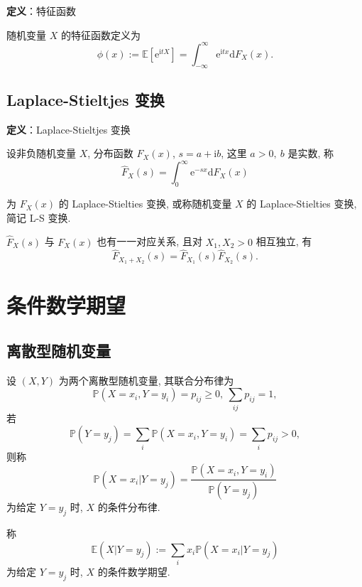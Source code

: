 \documentclass[openany]{ctexbook}
\theoremstyle{kaiti}
\theoremstyle{normal}
\begin{document}
\textbf{定义}：特征函数

随机变量 $X$ 的特征函数定义为 
\begin{equation}
  \phi(x):= \mathbb{E}[\mathrm{e}^{\mathrm{i}tX}]=\int_{-\infty}^\infty\mathrm{e}^{\mathrm{i}tx}\mathrm{d}F_X(x).
\end{equation}

\subsection{Laplace-Stieltjes 变换}

\textbf{定义}：Laplace-Stieltjes 变换

设非负随机变量 $X$, 分布函数 $F_X(x)$, $s=a+\mathrm{i}b$, 这里 $a>0,~b$ 是实数, 称
\begin{equation}
  \hat{F}_X(s)=\int_0^\infty\mathrm{e}^{-sx}\mathrm{d}F_X(x)
\end{equation}

为 $F_X(x)$ 的 Laplace-Stielties 变换, 或称随机变量 $X$ 的 Laplace-Stielties 变换, 简记 L-S 变换. 

$\hat{F}_X(s)$ 与 $F_X(x)$ 也有一一对应关系, 且对 $X_1,X_2>0$ 相互独立, 有
\begin{equation}
  \hat{F}_{X_1+X_2}(s)=\hat{F}_{X_1}(s)\hat{F}_{X_2}(s).
\end{equation}

\section{条件数学期望}

\subsection{离散型随机变量}

设 $(X,Y)$ 为两个离散型随机变量, 其联合分布律为
\begin{equation}
  \mathbb{P}(X=x_i,Y=y_i)=p_{ij}\geqslant0,~\sum_{ij}p_{ij}=1,
\end{equation}
若
\begin{equation}
  \mathbb{P}(Y=y_j)=\sum_i\mathbb{P}(X=x_i,Y=y_i)=\sum_ip_{ij}>0,
\end{equation}
则称
\begin{equation}
  \mathbb{P}(X=x_i|Y=y_j)=\frac{\mathbb{P}(X=x_i,Y=y_i)}{\mathbb{P}(Y=y_j)}
\end{equation}
为给定 $Y=y_j$ 时, $X$ 的条件分布律.

称
\begin{equation}
  \mathbb{E}(X|Y=y_j):=\sum_ix_i\mathbb{P}(X=x_i|Y=y_j)
\end{equation}
为给定 $Y=y_j$ 时, $X$ 的条件数学期望.
\end{document}
